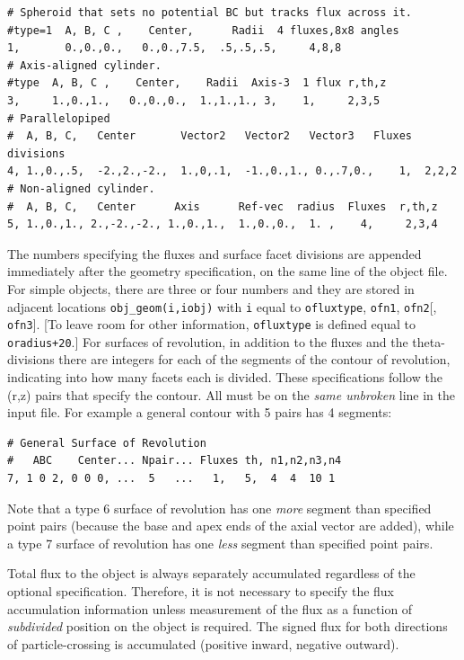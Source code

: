 \documentclass[12pt]{article}
\begin{document}
\begin{verbatim}
# Spheroid that sets no potential BC but tracks flux across it.
#type=1  A, B, C ,    Center,      Radii  4 fluxes,8x8 angles
1,       0.,0.,0.,   0.,0.,7.5,  .5,.5,.5,     4,8,8
# Axis-aligned cylinder.
#type  A, B, C ,    Center,    Radii  Axis-3  1 flux r,th,z
3,     1.,0.,1.,   0.,0.,0.,  1.,1.,1., 3,    1,     2,3,5
# Parallelopiped
#  A, B, C,   Center       Vector2   Vector2   Vector3   Fluxes divisions
4, 1.,0.,.5,  -2.,2.,-2.,  1.,0,.1,  -1.,0.,1., 0.,.7,0.,    1,  2,2,2
# Non-aligned cylinder.
#  A, B, C,   Center      Axis      Ref-vec  radius  Fluxes  r,th,z
5, 1.,0.,1., 2.,-2.,-2., 1.,0.,1.,  1.,0.,0.,  1. ,    4,     2,3,4
\end{verbatim}

The numbers specifying the fluxes and surface facet divisions are
appended immediately after the geometry specification, on the same
line of the object file. For simple objects, there are three or four
numbers and they are stored in adjacent locations
\verb!obj_geom(i,iobj)! with \verb!i!  equal to \verb!ofluxtype!,
\verb!ofn1!, \verb!ofn2![, \verb!ofn3!].  [To leave room for other
information, \verb!ofluxtype!  is defined equal to \verb!oradius+20!.]
For surfaces of revolution, in addition to the fluxes and the
theta-divisions there are integers for each of the segments of the
contour of revolution, indicating into how many facets each is
divided. These specifications follow the (r,z) pairs that specify the
contour. All must be on the \emph{same unbroken} line in the
input file. For example a general contour with 5 pairs has 4 segments:
\begin{verbatim}
# General Surface of Revolution
#   ABC    Center... Npair... Fluxes th, n1,n2,n3,n4
7, 1 0 2, 0 0 0, ...  5   ...   1,   5,  4  4  10 1 
\end{verbatim}
Note that a type 6 surface of revolution has one \emph{more} segment
than specified point pairs (because the base and apex ends of the
axial vector are added), while a type 7 surface of revolution has one
\emph{less} segment than specified point pairs. 

Total flux to the object is always separately accumulated regardless
of the optional specification.  Therefore, it is not necessary to
specify the flux accumulation information unless measurement of the
flux as a function of \emph{subdivided} position on the object is
required. The signed flux for both directions of particle-crossing
is accumulated (positive inward, negative outward). 
\end{document}
